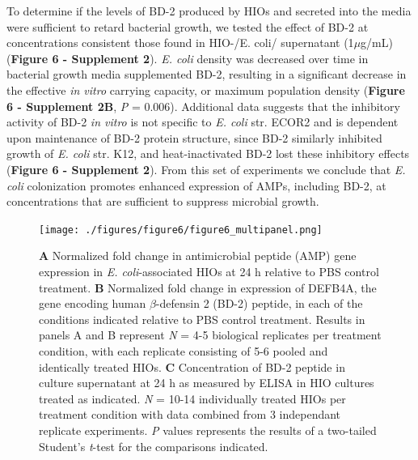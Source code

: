 \documentclass[9pt,lineo]{elife}
\begin{document}
To determine if the levels of BD-2 produced by HIOs and secreted into the media were sufficient to retard bacterial growth, we tested the effect of BD-2 at concentrations consistent those found in HIO-/E. coli/ supernatant (1\(\mu\)g/mL) (\textbf{Figure 6 - Supplement 2}). \emph{E. coli} density was decreased over time in bacterial growth media supplemented BD-2, resulting in a significant decrease in the effective \emph{in vitro} carrying capacity, or maximum population density (\textbf{Figure 6 - Supplement 2B}, \emph{P} = 0.006). Additional data suggests that the inhibitory activity of BD-2 \emph{in vitro} is not specific to \emph{E. coli} str. ECOR2 and is dependent upon maintenance of BD-2 protein structure, since BD-2 similarly inhibited growth of \emph{E. coli} str. K12, and heat-inactivated BD-2 lost these inhibitory effects (\textbf{Figure 6 - Supplement 2}). From this set of experiments we conclude that \emph{E. coli} colonization promotes enhanced expression of AMPs, including BD-2, at concentrations that are sufficient to suppress microbial growth. 

\begin{figure}
\begin{fullwidth}
\centering
\texttt{[image: ./figures/figure6/figure6\_multipanel.png]}
\caption{\textbf{A} Normalized fold change in antimicrobial peptide (AMP) gene expression in \textit{E. coli}-associated HIOs at 24 h relative to PBS control treatment. \textbf{B} Normalized fold change in expression of DEFB4A, the gene encoding human $\beta$-defensin 2 (BD-2) peptide, in each of the conditions indicated relative to PBS control treatment. Results in panels A and B represent \textit{N} = 4-5 biological replicates per treatment condition, with each replicate consisting of 5-6 pooled and identically treated HIOs. \textbf{C} Concentration of BD-2 peptide in culture supernatant at 24 h as measured by ELISA in HIO cultures treated as indicated. \textit{N} = 10-14 individually treated HIOs per treatment condition with data combined from 3 independant replicate experiments. \textit{P} values represents the results of a two-tailed Student's \textit{t}-test for the comparisons indicated.}
\label{fig:fullwidth}
\end{fullwidth}
\end{figure}
\end{document}
